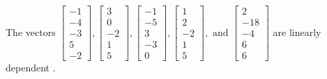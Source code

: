 \begin{exercise}
\begin{exerciseStatement}
  \end{exerciseStatement}
  \begin{exerciseAnswer}
   The vectors \(\left[\begin{array}{r}
-1 \\
-4 \\
-3 \\
5 \\
-2
\end{array}\right] , \left[\begin{array}{r}
3 \\
0 \\
-2 \\
1 \\
5
\end{array}\right] , \left[\begin{array}{r}
-1 \\
-5 \\
3 \\
-3 \\
0
\end{array}\right] , \left[\begin{array}{r}
1 \\
2 \\
-2 \\
1 \\
5
\end{array}\right] , \text{ and } \left[\begin{array}{r}
2 \\
-18 \\
-4 \\
6 \\
6
\end{array}\right]\) are 
  	 linearly dependent  .
  


  \end{exerciseAnswer}
\end{exercise}